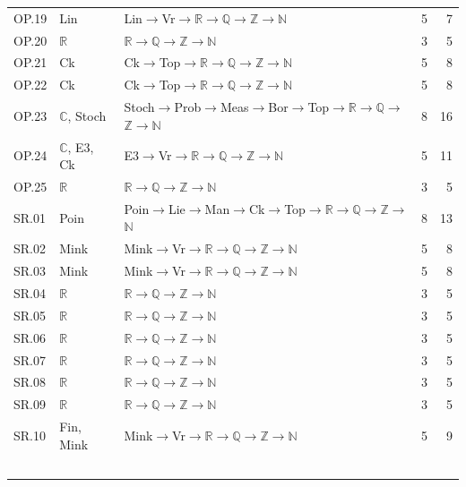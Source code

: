 {\begin{longtable}{l p{4.6cm} p{7.4cm} r r}
OP.19 & \textsf{Lin} & \textsf{Lin}$\to$\textsf{Vr}$\to$$\mathbb R$$\to$$\mathbb Q$$\to$$\mathbb Z$$\to$$\mathbb N$ & 5 & 7 \\
OP.20 & $\mathbb R$ & $\mathbb R$$\to$$\mathbb Q$$\to$$\mathbb Z$$\to$$\mathbb N$ & 3 & 5 \\
OP.21 & \textsf{Ck} & \textsf{Ck}$\to$\textsf{Top}$\to$$\mathbb R$$\to$$\mathbb Q$$\to$$\mathbb Z$$\to$$\mathbb N$ & 5 & 8 \\
OP.22 & \textsf{Ck} & \textsf{Ck}$\to$\textsf{Top}$\to$$\mathbb R$$\to$$\mathbb Q$$\to$$\mathbb Z$$\to$$\mathbb N$ & 5 & 8 \\
OP.23 & $\mathbb C$, \textsf{Stoch} & \textsf{Stoch}$\to$\textsf{Prob}$\to$\textsf{Meas}$\to$\textsf{Bor}$\to$\textsf{Top}$\to$$\mathbb R$$\to$$\mathbb Q$$\to$$\mathbb Z$$\to$$\mathbb N$ & 8 & 16 \\
OP.24 & $\mathbb C$, \textsf{E3}, \textsf{Ck} & \textsf{E3}$\to$\textsf{Vr}$\to$$\mathbb R$$\to$$\mathbb Q$$\to$$\mathbb Z$$\to$$\mathbb N$ & 5 & 11 \\
OP.25 & $\mathbb R$ & $\mathbb R$$\to$$\mathbb Q$$\to$$\mathbb Z$$\to$$\mathbb N$ & 3 & 5 \\
SR.01 & \textsf{Poin} & \textsf{Poin}$\to$\textsf{Lie}$\to$\textsf{Man}$\to$\textsf{Ck}$\to$\textsf{Top}$\to$$\mathbb R$$\to$$\mathbb Q$$\to$$\mathbb Z$$\to$$\mathbb N$ & 8 & 13 \\
SR.02 & \textsf{Mink} & \textsf{Mink}$\to$\textsf{Vr}$\to$$\mathbb R$$\to$$\mathbb Q$$\to$$\mathbb Z$$\to$$\mathbb N$ & 5 & 8 \\
SR.03 & \textsf{Mink} & \textsf{Mink}$\to$\textsf{Vr}$\to$$\mathbb R$$\to$$\mathbb Q$$\to$$\mathbb Z$$\to$$\mathbb N$ & 5 & 8 \\
SR.04 & $\mathbb R$ & $\mathbb R$$\to$$\mathbb Q$$\to$$\mathbb Z$$\to$$\mathbb N$ & 3 & 5 \\
SR.05 & $\mathbb R$ & $\mathbb R$$\to$$\mathbb Q$$\to$$\mathbb Z$$\to$$\mathbb N$ & 3 & 5 \\
SR.06 & $\mathbb R$ & $\mathbb R$$\to$$\mathbb Q$$\to$$\mathbb Z$$\to$$\mathbb N$ & 3 & 5 \\
SR.07 & $\mathbb R$ & $\mathbb R$$\to$$\mathbb Q$$\to$$\mathbb Z$$\to$$\mathbb N$ & 3 & 5 \\
SR.08 & $\mathbb R$ & $\mathbb R$$\to$$\mathbb Q$$\to$$\mathbb Z$$\to$$\mathbb N$ & 3 & 5 \\
SR.09 & $\mathbb R$ & $\mathbb R$$\to$$\mathbb Q$$\to$$\mathbb Z$$\to$$\mathbb N$ & 3 & 5 \\
SR.10 & \textsf{Fin}, \textsf{Mink} & \textsf{Mink}$\to$\textsf{Vr}$\to$$\mathbb R$$\to$$\mathbb Q$$\to$$\mathbb Z$$\to$$\mathbb N$ & 5 & 9 \\
$$
\end{longtable}}
